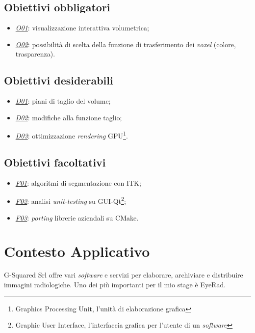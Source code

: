 \subsection{Obiettivi obbligatori}\label{sec:obiettivi-obbligatori}
\begin{itemize}
\item \underline{\textit{O01}}: visualizzazione interattiva volumetrica;
\item \underline{\textit{O02}}: possibilità di scelta della funzione di trasferimento dei \emph{voxel} (colore, trasparenza).
\end{itemize}

\subsection{Obiettivi desiderabili}\label{sec:obiettivi-desiderabili}
\begin{itemize}
\item \underline{\textit{D01}}: piani di taglio del volume;
\item \underline{\textit{D02}}: modifiche alla funzione taglio;
\item \underline{\textit{D03}}: ottimizzazione \emph{rendering} GPU\footnote{Graphics Processing Unit, l'unità di elaborazione grafica}.
\end{itemize}

\subsection{Obiettivi facoltativi}
\begin{itemize}
	 \item \underline{\textit{F01}}: algoritmi di segmentazione con ITK;
	 \item \underline{\textit{F02}}: analisi \emph{unit-testing} su GUI-Qt\footnote{Graphic User Interface, l'interfaccia grafica per l'utente di un \emph{software}};
	 \item \underline{\textit{F03}}: \emph{porting} librerie aziendali su CMake.
\end{itemize}

\section{Contesto Applicativo}
G-Squared Srl offre vari \emph{software} e servizi per elaborare, archiviare e distribuire immagini radiologiche. Uno dei più importanti per il mio stage è EyeRad.

